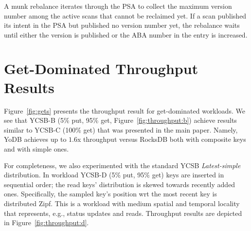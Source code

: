 \documentclass[letterpaper,twocolumn,10pt]{article}
\newcommand{\code}[1]{\textsf{\fontsize{9}{11}\selectfont #1}}
\newcommand{\sys}{YoDB}
\begin{document}
A munk rebalance iterates through the \code{PSA} to collect the maximum version number among the active scans that cannot be reclaimed yet. If a scan published its intent in the \code{PSA} but published no version number yet, the rebalance waits until either the version is published or the ABA number in the entry is increased. 


\section{Get-Dominated Throughput Results}

Figure~\ref{fig:gets} presents the throughput result for get-dominated workloads.   
We see that YCSB-B (5\% put, 95\% get, Figure~\ref{fig:throughput:b}) achieve results similar  to YCSB-C (100\% get) that was presented in the main paper.
Namely, \sys\/ achieves up to $1.6$x throughput versus RocksDB both with composite keys and with simple ones.   

For completeness, we also experimented with the standard YCSB  \emph{Latest-simple} distribution.
In workload YCSB-D (5\% put, 95\% get) keys are inserted in sequential order; the read keys' distribution is skewed towards recently added ones. 
Specifically, the sampled key's position wrt the most recent key is distributed Zipf. This is a 
workload with medium spatial and temporal locality that represents, e.g., status updates and reads. Throughput results are depicted in Figure~\ref{fig:throughput:d}.
\end{document}

